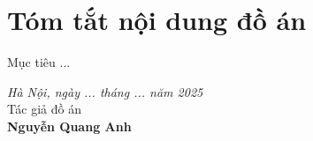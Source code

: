 \chapter*{Tóm tắt nội dung đồ án}

Mục tiêu ...

\vspace{-3mm}
\hspace{0.5\textwidth}
\begin{minipage}{0.5\textwidth}
	\noindent\begin{center}
		\vspace{1cm}
		\textit{Hà Nội, ngày ... tháng ... năm 2025} \\
		Tác giả đồ án\\ \vspace{1.5cm}
		\textbf{Nguyễn Quang Anh}
	\end{center}	
\end{minipage}
